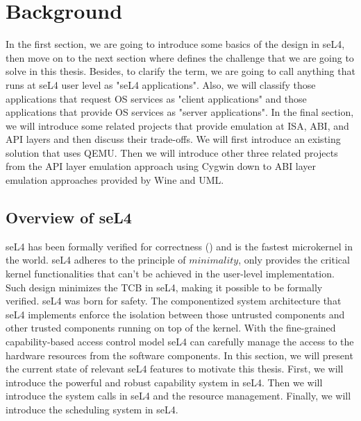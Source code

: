 \chapter{Background}\label{ch:background}

In the first section, we are going to introduce some basics of the design in seL4, then move on to the next section where defines the challenge that we are going to solve in this thesis. Besides, to clarify the term, we are going to call anything that runs at seL4 user level as "seL4 applications". Also, we will classify those applications that request OS services as "client applications" and those applications that provide OS services as "server applications". In the final section, we will introduce some related projects that provide emulation at ISA, ABI, and API layers and then discuss their trade-offs. We will first introduce an existing solution that uses QEMU. Then we will introduce other three related projects from the API layer emulation approach using Cygwin down to ABI layer emulation approaches provided by Wine and UML.  

\vspace*{-\dimexpr1.0ex+0.1\baselineskip\relax}

\section{Overview of seL4}

seL4 has been formally verified for correctness (\cite{Klein_EHACDEEKNSTW_09}) and is the fastest microkernel in the world. seL4 adheres to the principle of $minimality$, only provides the critical kernel functionalities that can't be achieved in the user-level implementation. Such design minimizes the TCB in seL4, making it possible to be formally verified. seL4 was born for safety. The componentized system architecture that seL4 implements enforce the isolation between those untrusted components and other trusted components running on top of the kernel. With the fine-grained capability-based access control model seL4 can carefully manage the access to the hardware resources from the software components. In this section, we will present the current state of relevant seL4 features to motivate this thesis. First, we will introduce the powerful and robust capability system in seL4. Then we will introduce the system calls in seL4 and the resource management. Finally, we will introduce the scheduling system in seL4.


